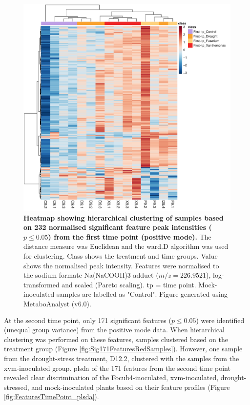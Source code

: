 \begin{figure}[hp!]
    \centering
    \includegraphics[width=\textwidth]{Figures/Sig232Features_heatmap_9_dpi72-ForThesis.pdf}
    \caption[Heatmap showing hierarchical clustering of samples based on 232 normalised significant feature peak intensities ($p \le0.05$) from the first time point (positive mode).]{\textbf{Heatmap showing hierarchical clustering of samples based on 232 normalised significant feature peak intensities ($p \le0.05$) from the first time point (positive mode).} The distance measure was Euclidean and the ward.D algorithm was used for clustering. Class shows the treatment and time groups. Value shows the normalised peak intensity. Features were normalised to the sodium formate Na(NaCOOH)3 adduct ($m/z=226.9521$), log-transformed and scaled (Pareto scaling). tp =  time point. Mock-inoculated samples are labelled as "Control".  Figure generated using MetaboAnalyst (v6.0).}
    \label{fig:Sig232FeaturesRedSamples}
\end{figure}

At the second time point, only 171 significant features ($p \le0.05$) were identified (unequal group variance) from the positive mode data. When hierarchical clustering was performed on these features, samples clustered based on the treatment group (Figure \ref{fig:Sig171FeaturesRedSamples}). However, one sample from the drought-stress treatment, D12.2, clustered with the samples from the \ac{xvm}-inoculated group. \Ac{plsda} of the 171 features from the second time point revealed clear discrimination of the \ac{Focub4}-inoculated, \ac{xvm}-inoculated, drought-stressed, and mock-inoculated plants based on their feature profiles (Figure \ref{fig:FeaturesTimePoint_plsda}). 

